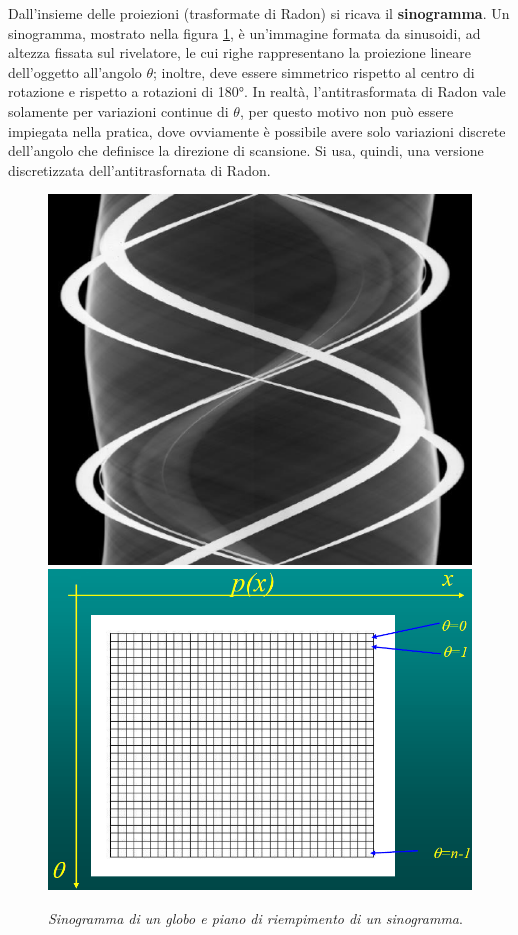 \documentclass{report}
\newcommand{\figref}[1]{figura \ref{#1}}
\numberwithin{equation}{section}
\numberwithin{figure}{section}
\begin{document}
Dall'insieme delle proiezioni (trasformate di Radon) si ricava il \textbf{sinogramma}. Un sinogramma, mostrato nella \figref{fig:sino}, è un’immagine formata da sinusoidi, ad altezza fissata sul rivelatore, le cui righe rappresentano la proiezione lineare dell'oggetto all'angolo $\theta$; inoltre, deve essere simmetrico rispetto al centro di rotazione e rispetto a rotazioni di 180°. In realtà, l'antitrasformata di Radon vale solamente per variazioni continue di $\theta$, per questo motivo non può essere impiegata nella pratica, dove ovviamente è possibile avere solo variazioni discrete dell'angolo che definisce la direzione di scansione. Si usa, quindi, una versione discretizzata dell'antitrasfornata di Radon.

\begin{figure}[htp]
\centering
\includegraphics[scale=0.674]{immagini/sinogramma.png}\quad\includegraphics[scale=0.4]{immagini/sino.png}
\caption{\label{fig:sino} \textit{Sinogramma di un globo e piano di riempimento di un sinogramma}.}
\end{figure}
\end{document}
